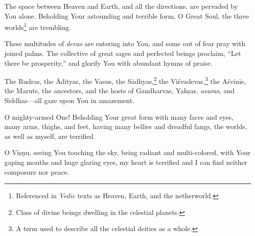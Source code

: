{The space between Heaven and Earth, and all the directions, are pervaded by You alone. Beholding Your astounding and terrible form, O Great Soul, the three worlds\footnote{Referenced in \textit{Vedic} texts as Heaven, Earth, and the netherworld.} are trembling.}

{These multitudes of \textit{devas} are entering into You, and some out of fear pray with joined palms. The collective of great sages and perfected beings proclaim, \enquote{Let there be prosperity,} and glorify You with abundant hymns of praise.}

{The Rudras, the Ādityas, the Vasus, the Sādhyas,\footnote{Class of divine beings dwelling in the celestial planets.} the Viśvadevas,\footnote{A term used to describe all the celestial deities as a whole.} the Aśvinīs, the Maruts, the ancestors, and the hosts of Gandharvas, Yakṣas, \textit{asuras}, and Siddhas---all gaze upon You in amazement.}

{O mighty-armed One! Beholding Your great form with many faces and eyes, many arms, thighs, and feet, having many bellies and dreadful fangs, the worlds, as well as myself, are terrified.}

{O Viṣṇu, seeing You touching the sky, being radiant and multi-colored, with Your gaping mouths and huge glaring eyes, my heart is terrified and I can find neither composure nor peace.}

